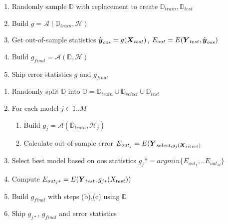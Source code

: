 \documentclass[12pt]{article}
\newcommand{\D}{\mathbb{D}}
\newcommand{\calA}{\mathcal{A}}
\newcommand{\calH}{\mathcal{H}}
\begin{document}
\begin{enumerate}
\begin{enumerate}
\item Randomly sample $\D$ with replacement to create $\D_{train}, \D_{test}$
\item Build $g=\calA(\D_{train}, \calH)$
\item Get out-of-sample statistics $\hat{\boldsymbol{y}}_{oos}=g(\boldsymbol{X}_{test})$, $E_{out}=E(\boldsymbol{Y}_{test}, \hat{\boldsymbol{y}}_{oos})$
\item Build $g_{final}=\calA(\D, \calH)$
\item Ship error statistics $g$ and $g_{final}$
\end{enumerate}




\begin{enumerate}
\item Randomly split $\D$ into $\D=\D_{train}\cup\D_{select}\cup\D_{test}$
\item For each model $j\in{1..M}$
	\begin{enumerate}
	\item Build $g_j=\calA(\D_{train}, \calH_j)$
    \item Calculate out-of-sample error $E_{out_j}=E(\boldsymbol{Y}_{select, g_j(\boldsymbol{X}_{select})}$
	\end{enumerate}
\item Select best model based on oos statistics $g_j*=argmin\{E_{out_1},..E_{out_M}\}$    
\item Compute $E_{out_j*}=E(\boldsymbol{Y}_{test}, g_{j*}(X_{test}))$
\item Build $g_{final}$ with steps (b),(c) using $\D$
\item Ship $g_{j*}$, $g_{final}$ and error statistics
\end{enumerate}



\end{enumerate}
\end{document}
